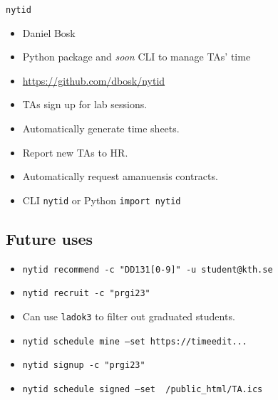 \begin{frame}[fragile]
  \begin{block}{\texttt{nytid}}
    \begin{itemize}
      \item Daniel Bosk
      \item Python package and \emph{soon} CLI to manage TAs' time
      \item \url{https://github.com/dbosk/nytid}
    \end{itemize}
  \end{block}

  \begin{example}
    \begin{itemize}
      \item TAs sign up for lab sessions.
      \item Automatically generate time sheets.
      \item Report new TAs to HR.
      \item Automatically request amanuensis contracts.

        \pause

      \item CLI \texttt{nytid} or
            Python \texttt{import nytid}
    \end{itemize}
  \end{example}
\end{frame}

\subsection{Future uses}

\begin{frame}[fragile]
  \begin{example}[TA pool]
    \begin{itemize}
      \item \texttt{nytid recommend -c "DD131[0-9]" -u student@kth.se}
      \item \texttt{nytid recruit -c "prgi23"}
      \item Can use \texttt{ladok3} to filter out graduated students.
    \end{itemize}
  \end{example}
  
  \pause

  \begin{example}[TA sign up]
    \begin{itemize}
      \item \texttt{nytid schedule mine --set  https://timeedit...}
      \item \texttt{nytid signup -c "prgi23"}
      \item \texttt{nytid schedule signed --set ~/public_html/TA.ics}
    \end{itemize}
  \end{example}
\end{frame}

